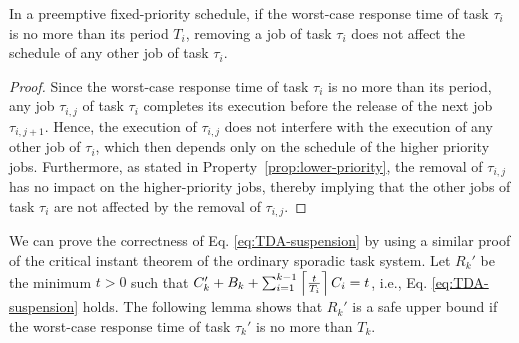 \begin{lemma}
\label{lemma:remove-same-task}
In a preemptive fixed-priority schedule, if the worst-case response time of task $\tau_i$ is no more than its period $T_i$, removing a job of task $\tau_i$ does not affect the schedule of any other job of task $\tau_i$.
\end{lemma}
\begin{proof}
Since the worst-case response time of task $\tau_i$ is no more than its period, any job $\tau_{i,j}$ of task $\tau_i$ completes its execution before the release of the next job $\tau_{i,j+1}$. Hence, the execution of $\tau_{i,j}$ does not interfere with the execution of any other job of $\tau_i$, which then depends only on the schedule of the higher priority jobs. Furthermore, as stated in Property~\ref{prop:lower-priority}, the removal of $\tau_{i,j}$ has no impact on the higher-priority jobs, thereby implying that the other jobs of task $\tau_i$ are not affected by the removal of $\tau_{i,j}$.
\end{proof}

We can prove the correctness of Eq. \eqref{eq:TDA-suspension} by using a similar proof of the critical instant theorem of the ordinary sporadic task system.
Let $R_k'$ be the minimum $t > 0$ such that  $C'_k + B_k + \sum_{i=1}^{k-1}\left\lceil{\frac{t}{T_i}}\right\rceil C_i = t$, i.e., Eq. \eqref{eq:TDA-suspension} holds. The following lemma shows that $R_k'$ is a safe upper bound if the worst-case response time of task $\tau_k'$ is no more than $T_k$.

